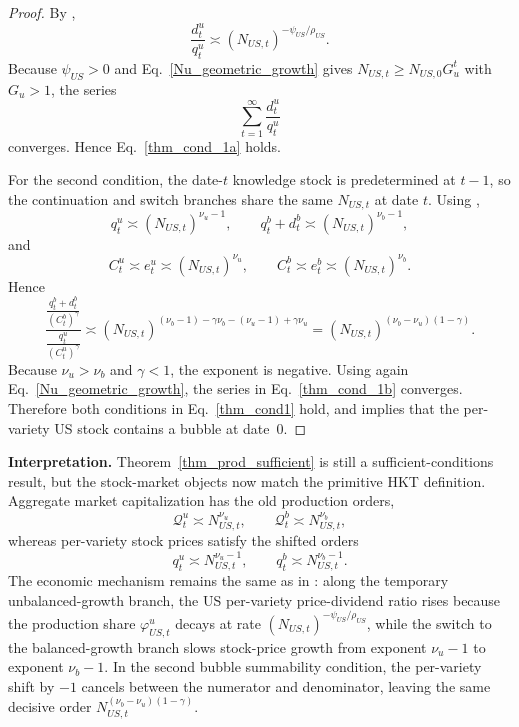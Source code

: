 \documentclass{article}
\begin{document}
\begin{proof}
By ,
\[
\frac{d_t^u}{q_t^u}\asymp (N_{US,t})^{-\psi_{US}/\rho_{US}}.
\]
Because $\psi_{US}>0$ and Eq.~\eqref{Nu_geometric_growth} gives $N_{US,t}\ge N_{US,0}G_u^t$ with $G_u>1$, the series
\[
\sum_{t=1}^{\infty}\frac{d_t^u}{q_t^u}
\]
converges. Hence Eq.~\eqref{thm_cond_1a} holds.

For the second condition, the date-$t$ knowledge stock is predetermined at $t-1$, so the continuation and switch branches share the same $N_{US,t}$ at date $t$. Using ,
\[
q_t^u\asymp (N_{US,t})^{\nu_u-1},
\qquad
q_t^b+d_t^b\asymp (N_{US,t})^{\nu_b-1},
\]
and
\[
C_t^u\asymp e_t^u\asymp (N_{US,t})^{\nu_u},
\qquad
C_t^b\asymp e_t^b\asymp (N_{US,t})^{\nu_b}.
\]
Hence
\[
\frac{\frac{q_t^b+d_t^b}{(C_t^b)^\gamma}}{\frac{q_t^u}{(C_t^u)^\gamma}}
\asymp
(N_{US,t})^{(\nu_b-1)-\gamma\nu_b-(\nu_u-1)+\gamma\nu_u}
=
(N_{US,t})^{(\nu_b-\nu_u)(1-\gamma)}.
\]
Because $\nu_u>\nu_b$ and $\gamma<1$, the exponent is negative. Using again Eq.~\eqref{Nu_geometric_growth}, the series in Eq.~\eqref{thm_cond_1b} converges. Therefore both conditions in Eq.~\eqref{thm_cond1} hold, and  implies that the per-variety US stock contains a bubble at date~0.
\end{proof}

\noindent
\textbf{Interpretation.} Theorem~\ref{thm_prod_sufficient} is still a sufficient-conditions result, but the stock-market objects now match the primitive HKT definition. Aggregate market capitalization has the old production orders,
\[
\mathcal Q_t^u\asymp N_{US,t}^{\nu_u},
\qquad
\mathcal Q_t^b\asymp N_{US,t}^{\nu_b},
\]
whereas per-variety stock prices satisfy the shifted orders
\[
q_t^u\asymp N_{US,t}^{\nu_u-1},
\qquad
q_t^b\asymp N_{US,t}^{\nu_b-1}.
\]
The economic mechanism remains the same as in \citet{hirano2025technological}: along the temporary unbalanced-growth branch, the US per-variety price-dividend ratio rises because the production share $\varphi_{US,t}^u$ decays at rate $(N_{US,t})^{-\psi_{US}/\rho_{US}}$, while the switch to the balanced-growth branch slows stock-price growth from exponent $\nu_u-1$ to exponent $\nu_b-1$. In the second bubble summability condition, the per-variety shift by $-1$ cancels between the numerator and denominator, leaving the same decisive order $N_{US,t}^{(\nu_b-\nu_u)(1-\gamma)}$.



\appendix


\end{document}
